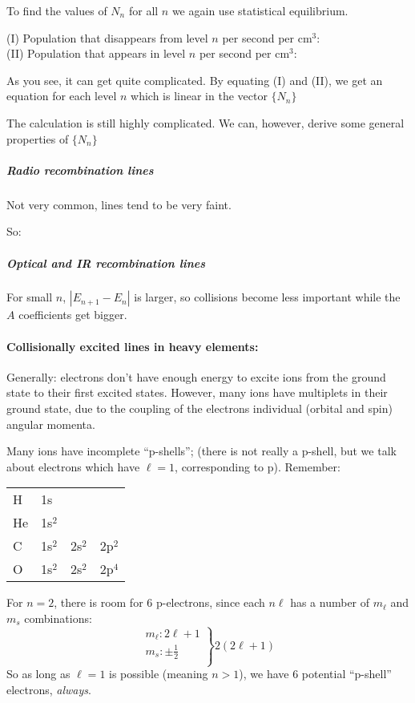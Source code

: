 \documentclass[11pt]{article}
\newcommand{\mar}[1]{\hspace{0pt}\marginpar{-\textcolor{black}{#1}-}}
\begin{document}
To find the values of $N_{n}$ for all $n$ we again use statistical equilibrium.

(I) Population that disappears from level $n$ per second per cm$^{3}$:
\[
    \]
(II) Population that appears in level $n$ per second per cm$^{3}$:
\[
    \]

As you see, it can get quite complicated. By equating (I) and (II), we
get an equation for each level $n$ which is linear in the vector
$\{ N_{n} \}$


\mar{71}The calculation is still highly complicated. We can, however,
derive some general properties of $\{N_{n}\}$

\subparagraph{Radio recombination lines}
Not very common, lines tend to be very faint.

\mar{72}So:
\[
    \]

\subparagraph{Optical and IR recombination lines}
For small $n$, $|E_{n+1} - E_{n}|$ is larger, so collisions become
less important while the $A$ coefficients get bigger.


\paragraph{Collisionally excited lines in heavy elements:}
\mar{79}Generally: electrons don't have enough energy to excite ions from
the ground state to their first excited states. However, many
ions have multiplets in their ground state, due to the coupling of
the electrons individual (orbital and spin) angular momenta.

Many ions have incomplete ``p-shells''; (there is not really a p-shell,
but we talk about electrons which have $\ell = 1$, corresponding to p).
Remember:

\begin{tabular}{l l l l}
    H & 1s\\
    He & 1s$^{2}$\\
    C & 1s$^{2}$ & 2s$^{2}$ & 2p$^{2}$\\
    O & 1s$^{2}$ & 2s$^{2}$ & 2p$^{4}$
\end{tabular}
For $n=2$, there is room for 6 p-electrons, since each $n\ell$ has
a number of $m_{\ell}$ and $m_{s}$ combinations:
\begin{equation*}
    \left.
        \begin{array}{l}
            m_{\ell}: 2\ell+1\\
            m_{s}: \pm \frac{1}{2}\\
        \end{array}
    \right\} 2(2\ell+1)
\end{equation*}
So as long as $\ell=1$ is possible (meaning $n>1$), we have 6 potential
``p-shell'' electrons, \emph{always}.
\end{document}
